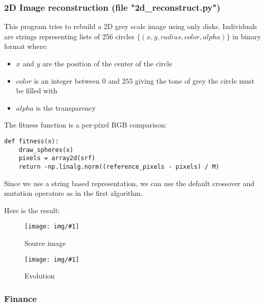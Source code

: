 \documentclass{article}
\newcommand{\IMG}[3]{
\begin{figure}[H]
\centering
\texttt{[image: img/\#1]}%
\caption{#2}%
\label{#1}%
\end{figure}

}
\begin{document}
\subsubsection{2D Image reconstruction  (file "2d_reconstruct.py")}
This program tries to rebuild a 2D grey scale image using only disks. Individuals are strings representing lists of 256 circles $\{ (x, y, radius, color, alpha) \}$ in binary format where:
\begin{itemize}
	\item $x$ and $y$ are the position of the center of the circle
	\item $color$ is an integer between $0$ and $255$ giving the tone of grey the circle must be filled with
	\item $alpha$ is the transparency
\end{itemize}


The fitness function is a per-pixel RGB comparison:
\begin{verbatim}
def fitness(x):
	draw_spheres(x)
	pixels = array2d(srf)
	return -np.linalg.norm((reference_pixels - pixels) / M)
\end{verbatim}

Since we use a string based representation, we can use the default crossover and mutation operators as in the first algorithm.

Here is the result:
\IMG{source.jpg}{Source image}{0.75}

\IMG{evolution.png}{Evolution}{0.75}


\subsubsection{Finance}
\end{document}
